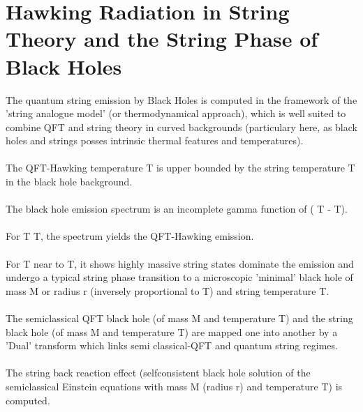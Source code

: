 \documentclass[12pt,a4paper]{article}
\begin{document}
\section{Hawking Radiation in String Theory and the String Phase of Black 
Holes}
The quantum string emission by Black Holes is computed in the framework of the 
'string analogue model' (or thermodynamical approach), which is well suited to 
combine QFT and string theory in curved backgrounds (particulary here, as black 
holes and strings posses intrinsic thermal features and temperatures).\\ \\
The QFT-Hawking temperature T\coordHE{} is upper bounded by the string 
temperature T\coordHE{} in the black hole background.\\ \\
The black hole emission spectrum is an incomplete gamma function of (
T\coordHE{} - T\coordHE{}).\\ \\
For T\coordHE{} T\coordHE{}, the spectrum yields the QFT-Hawking emission.\\ \\
For T\coordHE{} near to T\coordHE{}, it shows highly massive string 
states dominate the emission and undergo a typical string phase transition to 
a microscopic 'minimal' black hole of mass M\coordHE{} or radius 
r\coordHE{} (inversely proportional to T\coordHE{}) and string 
temperature T\coordHE{}.\\ \\
The semiclassical QFT black hole (of mass M and temperature T\coordHE{}) 
and the string black hole (of mass M\coordHE{} and temperature T\coordHE{}) are mapped one into another by a 'Dual' transform which links 
semi classical-QFT and quantum string regimes.\\ \\
The string back reaction effect (selfconsistent black hole solution of the 
semiclassical Einstein equations with mass M\myHighlight{$_{+}$}\coordHE{} (radius r\myHighlight{$_{+}$}\coordHE{}) and temperature T\myHighlight{$_{+}$}\coordHE{}) is computed.\\ \\
\end{document}
